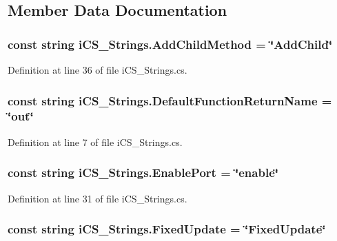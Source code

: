 \subsection{Member Data Documentation}
\hypertarget{classi_c_s___strings_a37059cf9f06e43a62de4efdcd9780315}{
\subsubsection[{Add\+Child\+Method}]{\setlength{\rightskip}{0pt plus 5cm}const string i\+C\+S\+\_\+\+Strings.\+Add\+Child\+Method = \char`\"{}Add\+Child\char`\"{}}}\label{classi_c_s___strings_a37059cf9f06e43a62de4efdcd9780315}


Definition at line 36 of file i\+C\+S\+\_\+\+Strings.\+cs.

\hypertarget{classi_c_s___strings_ab22512552fba49e9f4c04438542204a3}{
\subsubsection[{Default\+Function\+Return\+Name}]{\setlength{\rightskip}{0pt plus 5cm}const string i\+C\+S\+\_\+\+Strings.\+Default\+Function\+Return\+Name = \char`\"{}out\char`\"{}}}\label{classi_c_s___strings_ab22512552fba49e9f4c04438542204a3}


Definition at line 7 of file i\+C\+S\+\_\+\+Strings.\+cs.

\hypertarget{classi_c_s___strings_a38a4113da16ff7745db56a7079564c4c}{
\subsubsection[{Enable\+Port}]{\setlength{\rightskip}{0pt plus 5cm}const string i\+C\+S\+\_\+\+Strings.\+Enable\+Port = \char`\"{}enable\char`\"{}}}\label{classi_c_s___strings_a38a4113da16ff7745db56a7079564c4c}


Definition at line 31 of file i\+C\+S\+\_\+\+Strings.\+cs.

\hypertarget{classi_c_s___strings_a03d3b1cfbd2659001b3ef9813fcab111}{
\subsubsection[{Fixed\+Update}]{\setlength{\rightskip}{0pt plus 5cm}const string i\+C\+S\+\_\+\+Strings.\+Fixed\+Update = \char`\"{}Fixed\+Update\char`\"{}}}\label{classi_c_s___strings_a03d3b1cfbd2659001b3ef9813fcab111}


